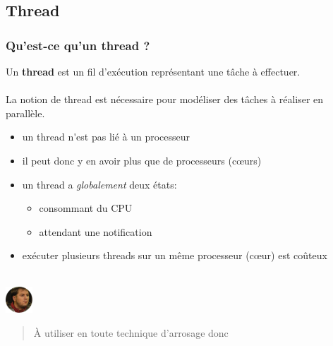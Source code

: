 \subsection{Thread}

\begin{frame}
	\frametitle{Qu'est-ce qu'un thread ?}
	Un \textbf{thread} est un fil d'ex\'{e}cution repr\'{e}sentant une t\^{a}che \`{a} effectuer.
    \\~\\
    La notion de thread est n\'{e}cessaire pour mod\'{e}liser des t\^{a}ches \`{a} r\'{e}aliser en parall\`{e}le.
    \begin{itemize}
    	\item un thread n\'{}est pas li\'{e} \`{a} un processeur
		\item il peut donc y en avoir plus que de processeurs (c\oe{}urs)
        \item un thread a \textit{globalement} deux \'{e}tats:
        \begin{itemize}
        	\item consommant du CPU
            \item attendant une notification
        \end{itemize}
        \item ex\'{e}cuter plusieurs threads sur un m\^{e}me processeur (c\oe{}ur) est co\^{u}teux
    \end{itemize}
    ~\\
    \includegraphics[width=1cm]{img/karadoc.png}
    \begin{quote}
    \`{A} utiliser en toute technique d'arrosage donc
    \end{quote}
\end{frame}

